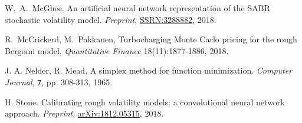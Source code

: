 \documentclass{article}
\theoremstyle{remark}
\begin{document}
\begin{thebibliography}{99}
W.~A.~McGhee. An artificial neural network representation of the SABR stochastic volatility model. \textit{Preprint}, \href{https://ssrn.com/abstract=3288882}{SSRN:3288882}, 2018.

 R.~McCrickerd, M.~Pakkanen, Turbocharging Monte Carlo pricing for the rough Bergomi model, \textit{Quantitative Finance} 18(11):1877-1886, 2018.

 J. A. Nelder, R. Mead, A simplex method for function minimization.
\textit{Computer Journal}, {\tt 7}, pp. 308-313, 1965.

H. Stone. Calibrating rough volatility models: a convolutional neural network approach. \textit{Preprint}, \href{https://arxiv.org/pdf/1812.05315.pdf}{arXiv:1812.05315}, 2018.
\end{thebibliography}
\end{document}
